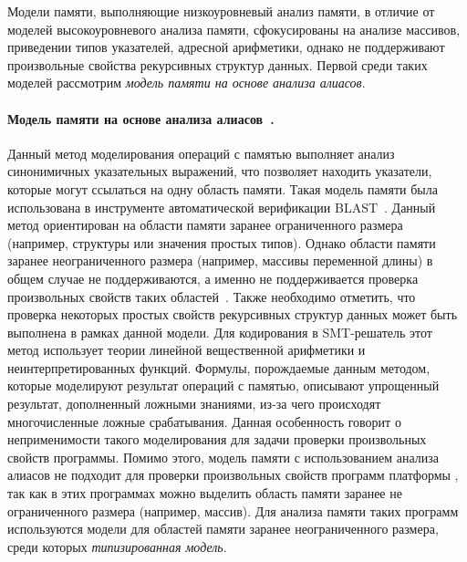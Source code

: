 Модели памяти, выполняющие низкоуровневый анализ памяти, в отличие от моделей высокоуровневого анализа памяти, сфокусированы на анализе массивов, приведении типов указателей, адресной арифметики, однако не поддерживают произвольные свойства рекурсивных структур данных. Первой среди таких моделей рассмотрим \emph{модель памяти на основе анализа алиасов}.

\paragraph{Модель памяти на основе анализа алиасов~\cite{andersen1994program}.} Данный метод моделирования операций с памятью выполняет анализ синонимичных указательных выражений, что позволяет находить указатели, которые могут ссылаться на одну область памяти. Такая модель памяти была использована в инструменте автоматической верификации \textsc{BLAST}~\cite{beyer2007software}. Данный метод ориентирован на области памяти заранее ограниченного размера (например, структуры или значения простых типов). Однако области памяти заранее неограниченного размера (например, массивы переменной длины) в общем случае не поддерживаются, а именно не поддерживается проверка произвольных свойств таких областей~\cite{mandrik}. Также необходимо отметить, что проверка некоторых простых свойств рекурсивных структур данных может быть выполнена в рамках данной модели.
Для кодирования в SMT-решатель этот метод использует теории линейной вещественной арифметики и неинтерпретированных функций. Формулы, порождаемые данным методом, которые моделируют результат операций с памятью, описывают упрощенный результат, дополненный ложными знаниями, из-за чего происходят многочисленные ложные срабатывания. Данная особенность говорит о неприменимости такого моделирования для задачи проверки произвольных свойств программы. Помимо этого, модель памяти с использованием анализа алиасов не подходит для проверки произвольных свойств программ платформы \dotnet{}, так как в этих программах можно выделить область памяти заранее не ограниченного размера (например, массив). Для анализа памяти таких программ используются модели для областей памяти заранее неограниченного размера, среди которых \emph{типизированная модель}.

